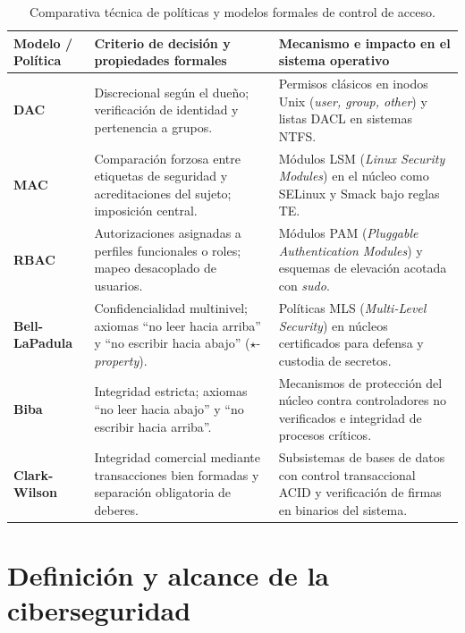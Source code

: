 \documentclass[12pt]{article}
\begin{document}
\begin{table}[htbp]
\centering
\footnotesize
\renewcommand{\arraystretch}{1.1}
\renewcommand{\tabularxcolumn}[1]{m{#1}}
\setlength{\emergencystretch}{1.5em}
\caption{Comparativa técnica de políticas y modelos formales de control de acceso.}
\label{tab:comparativaModelosControlAcceso}
\begin{tabularx}{\textwidth}{>{\centering\arraybackslash}m{2.4cm} X X}
\toprule
\textbf{Modelo / Política} & \textbf{Criterio de decisión y propiedades formales} & \textbf{Mecanismo e impacto en el sistema operativo} \\
\midrule
\textbf{DAC} & Discrecional según el dueño; verificación de identidad y pertenencia a grupos. & Permisos clásicos en inodos Unix (\textit{user, group, other}) y listas DACL en sistemas NTFS. \\
\addlinespace
\textbf{MAC} & Comparación forzosa entre etiquetas de seguridad y acreditaciones del sujeto; imposición central. & Módulos LSM (\textit{Linux Security Modules}) en el núcleo como SELinux y Smack bajo reglas TE. \\
\addlinespace
\textbf{RBAC} & Autorizaciones asignadas a perfiles funcionales o roles; mapeo desacoplado de usuarios. & Módulos PAM (\textit{Pluggable Authentication Modules}) y esquemas de elevación acotada con \textit{sudo}. \\
\addlinespace
\textbf{Bell-LaPadula} & Confidencialidad multinivel; axiomas \enquote{no leer hacia arriba} y \enquote{no escribir hacia abajo} ($\star$-\textit{property}). & Políticas MLS (\textit{Multi-Level Security}) en núcleos certificados para defensa y custodia de secretos. \\
\addlinespace
\textbf{Biba} & Integridad estricta; axiomas \enquote{no leer hacia abajo} y \enquote{no escribir hacia arriba}. & Mecanismos de protección del núcleo contra controladores no verificados e integridad de procesos críticos. \\
\addlinespace
\textbf{Clark-Wilson} & Integridad comercial mediante transacciones bien formadas y separación obligatoria de deberes. & Subsistemas de bases de datos con control transaccional ACID y verificación de firmas en binarios del sistema. \\
\bottomrule
\end{tabularx}
\end{table}

\section{Definición y alcance de la ciberseguridad}\label{sec:definicionAlcanceCiberseguridad}
\end{document}
